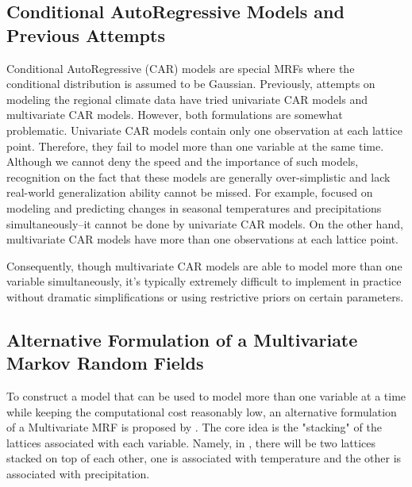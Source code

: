 \documentclass{article}
\begin{document}
\subsection{Conditional AutoRegressive Models and Previous Attempts}
Conditional AutoRegressive (CAR) models are special MRFs where the conditional distribution is assumed to be Gaussian. Previously, attempts on modeling the regional climate data have tried univariate CAR models and multivariate CAR models. However, both formulations are somewhat problematic. Univariate CAR models contain only one observation at each lattice point. Therefore, they fail to model more than one variable at the same time. Although we cannot deny the speed and the importance of such models, recognition on the fact that these models are generally over-simplistic and lack real-world generalization ability cannot be missed. For example, \cite{paper} focused on modeling and predicting changes in seasonal temperatures and precipitations simultaneously--it cannot be done by univariate CAR models. On the other hand, multivariate CAR models have more than one observations at each lattice point.

Consequently, though multivariate CAR models are able to model more than one variable simultaneously, it's typically extremely difficult to implement in practice without dramatic simplifications or using restrictive priors on certain parameters. 

\subsection{Alternative Formulation of a Multivariate Markov Random Fields}
To construct a model that can be used to model more than one variable at a time while keeping the computational cost reasonably low, an alternative formulation of a Multivariate MRF is proposed by \cite{paper}. The core idea is the "stacking" of the lattices associated with each variable. Namely, in \cite{paper}, there will be two lattices stacked on top of each other, one is associated with temperature and the other is associated with precipitation.
\end{document}
